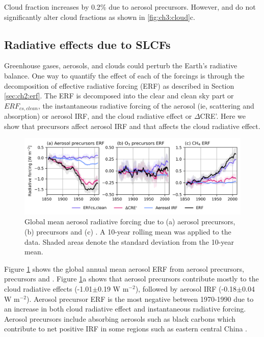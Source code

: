 Cloud fraction increases by 0.2\% due to aerosol precursors. However,  and  do not significantly alter cloud fractions as shown in \ref{fig:ch3:cloud}c. 


\subsection{Radiative effects due to SLCFs}

Greenhouse gases, aerosols, and clouds could perturb the Earth's radiative balance. One way to quantify the effect of each of the forcings is through the decomposition of effective radiative forcing (ERF) as described in Section \ref{sec:ch2:erf}. The ERF is decomposed into the clear and clean sky part or $ERF_{cs,clean}$, the instantaneous radiative forcing of the aerosol (ie, scattering and absorption) or aerosol IRF, and the cloud radiative effect or $\Delta$CRE'. Here we show that  precursors affect aerosol IRF and that  affects the cloud radiative effect.

\begin{figure}
    \centering
    \includegraphics[width=\linewidth]{Chapter3/Figs/f10_erf.png}
    \caption[Global mean radiative forcing due to SLCFs]{Global mean aerosol radiative forcing due to (a) aerosol precursors, (b)  precursors and (c) . A 10-year rolling mean was applied to the data. Shaded areas denote the standard deviation from the 10-year mean.}
    \label{fig:ch3:erf}
\end{figure}

Figure \ref{fig:ch3:erf} shows the global annual mean aerosol ERF from aerosol precursors,  precursors and . Figure \ref{fig:ch3:erf}a shows that aerosol precursors contribute mostly to the cloud radiative effects (-1.01$\pm$0.19 W m$^{-2}$), followed by aerosol IRF (-0.18$\pm$0.04 W m$^{-2}$). Aerosol precursor ERF is the most negative between 1970-1990 due to an increase in both cloud radiative effect and instantaneous radiative forcing. Aerosol precursors include absorbing aerosols such as black carbons which contribute to net positive IRF in some regions such as eastern central China \citep{seoImpactsAerosolEmissions2020, oconnorAssessmentPreindustrialPresentday2021}. 


